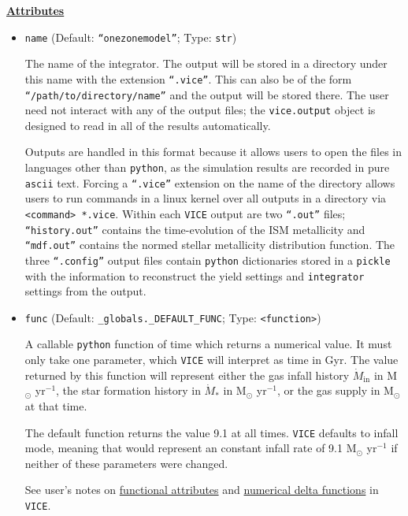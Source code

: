 \documentclass{report}
\begin{document}
\null\par\noindent
\underline{\textbf{Attributes}}
\par
\begin{itemize}
	\item{ %
		\texttt{name} (Default: \texttt{``onezonemodel''}; Type: \texttt{str}) 
		\par
		The name of the integrator. The output will be stored in a directory 
		under this name with the extension \texttt{``.vice''}. This can also 
		be of the form \texttt{``/path/to/directory/name''} and the output 
		will be stored there. The user need not interact with any of the 
		output files; the \texttt{vice.output} object is designed to read in 
		all of the results automatically. 
		\par
		Outputs are handled in this format because it allows users to open 
		the files in languages other than \texttt{python}, as the simulation 
		results are recorded in pure \texttt{ascii} text. Forcing a 
		\texttt{``.vice''} extension on the name of the directory allows users 
		to run commands in a linux kernel over all outputs in a directory via 
		\texttt{<command> *.vice}. Within each \texttt{VICE} output are two 
		\texttt{``.out''} files; \texttt{``history.out''} contains the 
		time-evolution of the ISM metallicity and \texttt{``mdf.out''} 
		contains the normed stellar metallicity distribution function. The 
		three \texttt{``.config''} output files contain \texttt{python} 
		dictionaries stored in a \texttt{pickle} with the information to 
		reconstruct the yield settings and \texttt{integrator} settings from 
		the output. 
	}

	\item{ %
		\texttt{func} (Default: \texttt{\_globals.\_DEFAULT\_FUNC}; 
		Type: \texttt{<function>}) 
		\par
		A callable \texttt{python} function of time which returns a numerical 
		value. It must only take one parameter, which \texttt{VICE} will 
		interpret as time in Gyr. The value returned by this function will 
		represent either the gas infall history $\dot{M}_\text{in}$ in 
		M$_\odot$ yr$^{-1}$, the star formation history in $\dot{M}_*$ in 
		M$_\odot$ yr$^{-1}$, or the gas supply in M$_\odot$ at that time. 
		\par
		The default function returns the value 9.1 at all times. \texttt{VICE} 
		defaults to infall mode, meaning that would represent an constant 
		infall rate of 9.1 M$_\odot$ yr$^{-1}$ if neither of these parameters 
		were changed. 
		\par
		See user's notes on \hyperlink{note:pyfuncs}{functional attributes} and  
		\hyperlink{note:delta_funcs}{numerical delta functions} in 
		\texttt{VICE}. 
	}


\end{itemize}
\end{document}
